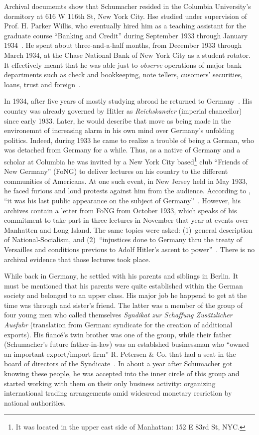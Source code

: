 Archival documemts show that Schumacher resided in the Columbia University's dormitory at 616 W 116th St, New York City. Hse studied under supervision of Prof. H. Parker Willis, who eventually hired him as a teaching assistant for the graduate course ``Banking and Credit'' during September 1933 through January 1934~\citep{schumacher1934}. He spent about three-and-a-half months, from December 1933 through March 1934, at the Chase National Bank of New York City as a student rotator. It effectively meant that he was able just to \textit{observe} operations of major bank departments such as check and bookkeeping, note tellers, cusomers' securities, loans, trust and foreign~\citep{schumacher1934_}. 

In 1934, after five years of mostly studying abroad he returned to Germany~\cite[p.~62]{wood1984}. His country was already governed by Hitler as \textit{Reichskanzler} (imperial chancellor) since early 1933. Later, he would describe that move as being made in the environemnt of increasing alarm in his own mind over Germany's unfolding politics. Indeed, during 1933 he came to realize a trouble of being a German, who was detached from Germany for a while. Thus, as a native of Germany and a scholar at Columbia he was invited by a New York City based\footnote{It was located in the upper east side of Manhattan: 152 E 83rd St, NYC.} club ``Friends of New Germany'' (FoNG) to deliver lectures on his country to the different communities of Americans. At one such event, in New Jersey held in May 1933, he faced furious and loud protests against him from the audience. According to \citeauthor{wood1984}, ``it was his last public appearance on the subject of Germany''~\cite[p.~59]{wood1984}. However, his archives contain a letter from FoNG from October 1933, which speaks of his commitment to take part in three lectures in November that year at events over Manhatten and Long Island. The same topics were asked: (1)~general description of National-Socialism, and (2)~``injustices done to Germany thru the treaty of Versailles and conditions previous to Adolf Hitler's ascent to power''~\citep{schumacher1933}. There is no archival evidence that those lectures took place. 

While back in Germany, he settled with his parents and siblings in Berlin. It must be mentioned that his parents were quite established within the German society and belonged to an upper class. His major job he happend to get at the time was through and sister's friend. The latter was a member of the group of four young men who called themselves \textit{Syndikat zur Schaffung Zus{\"a}tzlicher Ausfuhr} (translation from German: syndicate for the creation of additional exports). His fianc{\'e}'s twin brother was one of the group, while their father (Schumacher's future father-in-law) was an establshed businessman who ``owned an important export/import firm'' R. Petersen \& Co. that had a seat in the board of directors of the Syndicate~\cite[p.~77]{wood1984}. In about a year after Schumacher got knowing these people, he was accepted into the inner circle of this group and started working with them on their only business activity: organizing international trading arrangements amid widesread monetary resriction by national authorities.

